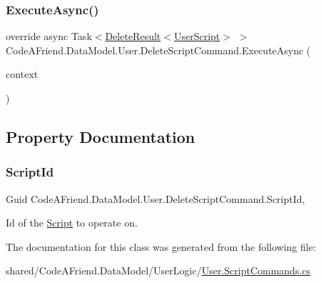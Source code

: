 \subsubsection{\texorpdfstring{Execute\+Async()}{ExecuteAsync()}}
{\footnotesize\ttfamily override async Task$<$\mbox{\hyperlink{class_code_a_friend_1_1_data_model_1_1_delete_result}{Delete\+Result}}$<$\mbox{\hyperlink{class_code_a_friend_1_1_data_model_1_1_user_script}{User\+Script}}$>$ $>$ Code\+A\+Friend.\+Data\+Model.\+User.\+Delete\+Script\+Command.\+Execute\+Async (\begin{DoxyParamCaption}\item[{Db\+Context}]{context }\end{DoxyParamCaption})}







\subsection{Property Documentation}
\mbox{\label{class_code_a_friend_1_1_data_model_1_1_user_1_1_delete_script_command_a1f857c62d2d1e84239b98a892ebe8da7}} 
\subsubsection{\texorpdfstring{Script\+Id}{ScriptId}}
{\footnotesize\ttfamily Guid Code\+A\+Friend.\+Data\+Model.\+User.\+Delete\+Script\+Command.\+Script\+Id\hspace{0.3cm}{\ttfamily [get]}, {\ttfamily [set]}}



Id of the \mbox{\hyperlink{class_code_a_friend_1_1_data_model_1_1_script}{Script}} to operate on.



The documentation for this class was generated from the following file\+:\begin{DoxyCompactItemize}
\item 
shared/\+Code\+A\+Friend.\+Data\+Model/\+User\+Logic/\mbox{\hyperlink{_user_8_script_commands_8cs}{User.\+Script\+Commands.\+cs}}\end{DoxyCompactItemize}
